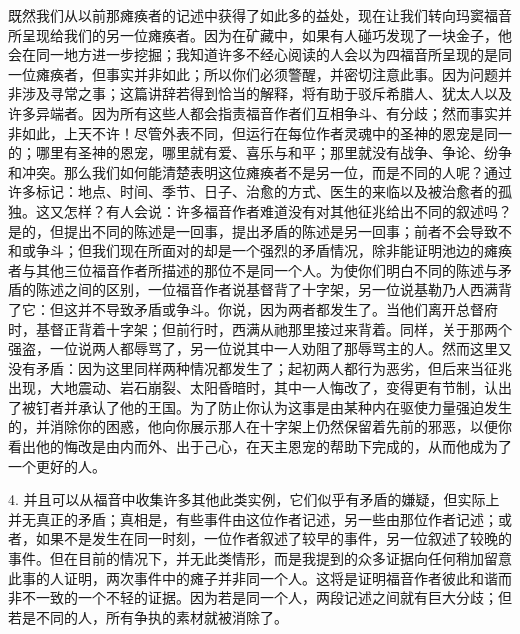 既然我们从以前那瘫痪者的记述中获得了如此多的益处，现在让我们转向玛窦福音所呈现给我们的另一位瘫痪者。因为在矿藏中，如果有人碰巧发现了一块金子，他会在同一地方进一步挖掘；我知道许多不经心阅读的人会以为四福音所呈现的是同一位瘫痪者，但事实并非如此；所以你们必须警醒，并密切注意此事。因为问题并非涉及寻常之事；这篇讲辞若得到恰当的解释，将有助于驳斥希腊人、犹太人以及许多异端者。因为所有这些人都会指责福音作者们互相争斗、有分歧；然而事实并非如此，上天不许！尽管外表不同，但运行在每位作者灵魂中的圣神的恩宠是同一的；哪里有圣神的恩宠，哪里就有爱、喜乐与和平；那里就没有战争、争论、纷争和冲突。那么我们如何能清楚表明这位瘫痪者不是另一位，而是不同的人呢？通过许多标记：地点、时间、季节、日子、治愈的方式、医生的来临以及被治愈者的孤独。这又怎样？有人会说：许多福音作者难道没有对其他征兆给出不同的叙述吗？是的，但提出不同的陈述是一回事，提出矛盾的陈述是另一回事；前者不会导致不和或争斗；但我们现在所面对的却是一个强烈的矛盾情况，除非能证明池边的瘫痪者与其他三位福音作者所描述的那位不是同一个人。为使你们明白不同的陈述与矛盾的陈述之间的区别，一位福音作者说基督背了十字架，另一位说基勒乃人西满背了它：但这并不导致矛盾或争斗。你说，因为两者都发生了。当他们离开总督府时，基督正背着十字架；但前行时，西满从祂那里接过来背着。同样，关于那两个强盗，一位说两人都辱骂了，另一位说其中一人劝阻了那辱骂主的人。然而这里又没有矛盾：因为这里同样两种情况都发生了；起初两人都行为恶劣，但后来当征兆出现，大地震动、岩石崩裂、太阳昏暗时，其中一人悔改了，变得更有节制，认出了被钉者并承认了他的王国。为了防止你认为这事是由某种内在驱使力量强迫发生的，并消除你的困惑，他向你展示那人在十字架上仍然保留着先前的邪恶，以便你看出他的悔改是由内而外、出于己心，在天主恩宠的帮助下完成的，从而他成为了一个更好的人。\par

4. 并且可以从福音中收集许多其他此类实例，它们似乎有矛盾的嫌疑，但实际上并无真正的矛盾；真相是，有些事件由这位作者记述，另一些由那位作者记述；或者，如果不是发生在同一时刻，一位作者叙述了较早的事件，另一位叙述了较晚的事件。但在目前的情况下，并无此类情形，而是我提到的众多证据向任何稍加留意此事的人证明，两次事件中的瘫子并非同一个人。这将是证明福音作者彼此和谐而非不一致的一个不轻的证据。因为若是同一个人，两段记述之间就有巨大分歧；但若是不同的人，所有争执的素材就被消除了。\par

